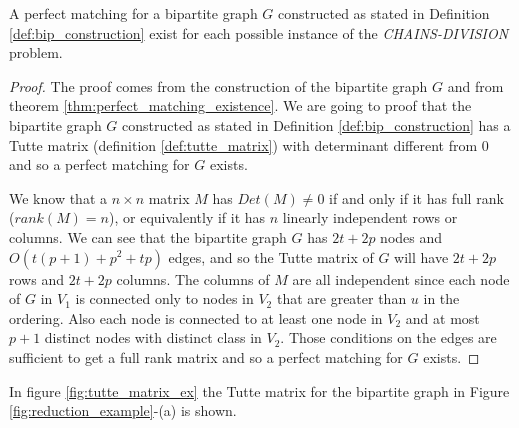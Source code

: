 \begin{lemma} \label{lemma:matching_existence}
    A perfect matching for a bipartite graph $G$ constructed as stated in Definition \ref{def:bip_construction} exist for each possible instance of the \textit{CHAINS-DIVISION} problem.
\end{lemma}

\begin{proof}
    The proof comes from the construction of the bipartite graph $G$ and from theorem \ref{thm:perfect_matching_existence}. We are going to proof that the bipartite graph $G$ constructed as stated in Definition \ref{def:bip_construction} has a Tutte matrix (definition \ref{def:tutte_matrix}) with determinant different from $0$ and so a perfect matching for $G$ exists. 

    We know that a $n \times n$ matrix $M$ has $Det(M) \neq 0$ if and only if it has full rank ($rank(M) = n$), or equivalently if it has $n$ linearly independent rows or columns. We can see that the bipartite graph $G$ has $2t + 2p$ nodes and $O(t (p + 1) + p^2 + tp)$ edges, and so the Tutte matrix of $G$ will have $2t + 2p$ rows and $2t + 2p$ columns. The columns of $M$ are all independent since each node of $G$ in $V_1$ is connected only to nodes in $V_2$ that are greater than $u$ in the ordering. Also each node is connected to at least one node in $V_2$ and at most $p + 1$ distinct nodes with distinct class in $V_2$. Those conditions on the edges are sufficient to get a full rank matrix and so a perfect matching for $G$ exists.
\end{proof}

In figure \ref{fig:tutte_matrix_ex} the Tutte matrix for the bipartite graph in Figure \ref{fig:reduction_example}-(a) is shown.

